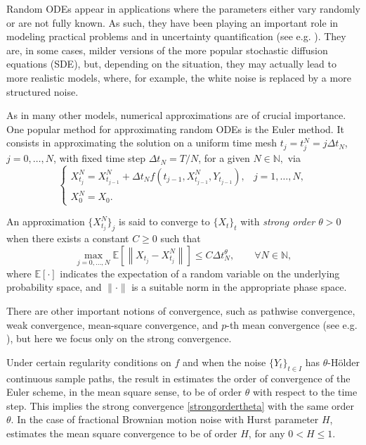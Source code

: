 \documentclass[reqno,12pt]{amsart}
\theoremstyle{plain} %
\theoremstyle{definition} %
\begin{document}
Random ODEs appear in applications where the parameters either vary randomly or are not fully known. As such, they have been playing an important role in modeling practical problems and in uncertainty quantification (see e.g. \cite{Asai2016,BogdanoffGoldbergBernard1961,FreidlinWentzell1992,HanKloeden2017,MerdanBekiryaziciKesemenKhaniyev2017,NeckelRupp2013,SalakoShen2020,StrasserTheisMarr2012}). They are, in some cases, milder versions of the more popular stochastic diffusion equations (SDE), but, depending on the situation, they may actually lead to more realistic models, where, for example, the white noise is replaced by a more structured noise.

As in many other models, numerical approximations are of crucial importance. One popular method for approximating random ODEs is the Euler method. It consists in approximating the solution on a uniform time mesh $t_j = t_j^N = j\Delta t_N$, $j = 0, \ldots, N$, with fixed time step $\Delta t_N = T/N$, for a given $N\in \mathbb{N},$ via
\begin{equation}
  \label{emscheme}
  \begin{cases}
    X_{t_j}^N = X_{t_{j-1}}^N + \Delta t_N f(t_{j-1}, X_{t_{j-1}}^N, Y_{t_{j-1}}), & j = 1, \ldots, N, \\
    X_0^N = X_0.
  \end{cases}
\end{equation}

An approximation $\{X_{t_j}^N\}_j$ is said to converge to $\{X_t\}_t$ with \emph{strong order $\theta>0$} when there exists a constant $C \geq 0$ such that
\begin{equation}
    \label{strongordertheta}
    \max_{j=0, \ldots, N}\mathbb{E}\left[ \left\| X_{t_j} - X_{t_j}^N \right\| \right] \leq C \Delta t_N^\theta, \qquad \forall N \in \mathbb{N},
\end{equation}
where $\mathbb{E}[\cdot]$ indicates the expectation of a random variable on the underlying probability space, and $\|\cdot\|$ is a suitable norm in the appropriate phase space.

There are other important notions of convergence, such as pathwise convergence, weak convergence, mean-square convergence, and $p$-th mean convergence (see e.g. \cite{GruneKloeden2001,HighamKloeden2021,KloedenJentzen2007,JentzenKloeden2011,AsaiKloeden2016,HanKloeden2017}), but here we focus only on the strong convergence.

Under certain regularity conditions on $f$ and when the noise $\{Y_t\}_{t\in I}$ has $\theta$-H\"older continuous sample paths, the result in \cite[Theorem 3]{WangCaoHanKloeden2021} estimates the order of convergence of the Euler scheme, in the mean square sense, to be of order $\theta$ with respect to the time step. This implies the strong convergence \cref{strongordertheta} with the same order $\theta$. In the case of fractional Brownian motion noise with Hurst parameter $H$, \cite[Theorem 2]{WangCaoHanKloeden2021} estimates the mean square convergence to be of order $H$, for any $0 < H \leq 1.$
\end{document}
